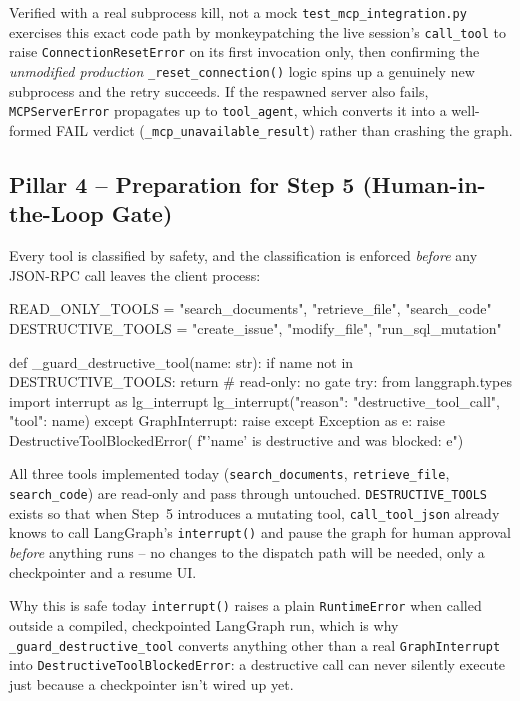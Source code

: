 \documentclass[11pt,a4paper]{article}
\begin{document}
\begin{successbox}{Verified with a real subprocess kill, not a mock}
\texttt{test\_mcp\_integration.py} exercises this exact code path by
monkeypatching the live session's \texttt{call\_tool} to raise
\texttt{ConnectionResetError} on its first invocation only, then
confirming the \emph{unmodified production} \texttt{\_reset\_connection()}
logic spins up a genuinely new subprocess and the retry succeeds. If the
respawned server also fails, \texttt{MCPServerError} propagates up to
\texttt{tool\_agent}, which converts it into a well-formed FAIL verdict
(\texttt{\_mcp\_unavailable\_result}) rather than crashing the graph.
\end{successbox}

\subsection{Pillar 4 -- Preparation for Step 5 (Human-in-the-Loop Gate)}

Every tool is classified by safety, and the classification is enforced
\emph{before} any JSON-RPC call leaves the client process:

\begin{pycode}
READ_ONLY_TOOLS = {"search_documents", "retrieve_file", "search_code"}
DESTRUCTIVE_TOOLS = {"create_issue", "modify_file", "run_sql_mutation"}

def _guard_destructive_tool(name: str):
    if name not in DESTRUCTIVE_TOOLS:
        return                                   # read-only: no gate
    try:
        from langgraph.types import interrupt as lg_interrupt
        lg_interrupt({"reason": "destructive_tool_call", "tool": name})
    except GraphInterrupt:
        raise
    except Exception as e:
        raise DestructiveToolBlockedError(
            f"'{name}' is destructive and was blocked: {e}")
\end{pycode}

All three tools implemented today (\texttt{search\_documents},
\texttt{retrieve\_file}, \texttt{search\_code}) are read-only and pass
through untouched. \texttt{DESTRUCTIVE\_TOOLS} exists so that when Step~5
introduces a mutating tool, \texttt{call\_tool\_json} already knows to
call LangGraph's \texttt{interrupt()} and pause the graph for human
approval \emph{before} anything runs -- no changes to the dispatch path
will be needed, only a checkpointer and a resume UI.

\begin{infobox}{Why this is safe today}
\texttt{interrupt()} raises a plain \texttt{RuntimeError} when called
outside a compiled, checkpointed LangGraph run, which is why
\texttt{\_guard\_destructive\_tool} converts anything other than a real
\texttt{GraphInterrupt} into \texttt{DestructiveToolBlockedError}: a
destructive call can never silently execute just because a checkpointer
isn't wired up yet.
\end{infobox}
\end{document}
